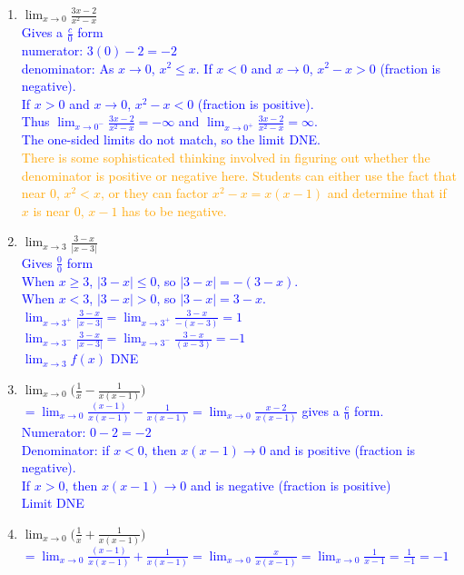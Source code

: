 \documentclass{ximera}
\begin{document}
\begin{exercise}
\begin{enumerate}
    \item $\displaystyle \lim_{x\rightarrow 0}\frac{3x-2}{x^2-x}$\\
     \textcolor{blue}{ Gives a $\frac{c}{0}$ form\\
   numerator: $3(0)-2=-2$\\
    denominator: As $x\rightarrow 0$, $x^2\leq x$.  If $x<0$ and $x\rightarrow 0$, $x^2-x>0$ (fraction is negative).\\
    If $x>0$ and $x\rightarrow 0$, $x^2-x<0$ (fraction is positive).\\
    Thus $\displaystyle \lim_{x\rightarrow 0^-} \frac{3x-2}{x^2-x}=-\infty$ and $\displaystyle \lim_{x\rightarrow 0^+} \frac{3x-2}{x^2-x}=\infty$.\\
    The one-sided limits do not match, so the limit DNE.}\\
    \textcolor{orange}{There is some sophisticated thinking involved in figuring out whether the denominator is positive or negative here.  Students can either use the fact that near 0, $x^2<x$, or they can factor $x^2-x=x(x-1)$ and determine that if $x$ is near 0, $x-1$ has to be negative.}

   \item $\displaystyle \lim_{x\rightarrow 3} \frac{3-x}{|x-3|}$\\
    \textcolor{blue}{ Gives $\frac{0}{0}$ form\\
    When $x\geq 3$, $|3-x|\leq 0$, so $|3-x|=-(3-x)$.\\
    When $x<3$, $|3-x|>0$, so $|3-x|=3-x$.\\
    $\lim_{x\rightarrow 3^+}\frac{3-x}{|x-3|}=\lim_{x\rightarrow 3^+}\frac{3-x}{-(x-3)}=1$\\
     $\lim_{x\rightarrow 3^-}\frac{3-x}{|x-3|}=\lim_{x\rightarrow 3^-}\frac{3-x}{(x-3)}=-1$\\
    $\lim_{x\rightarrow 3}f(x)$ DNE}

    \item $\displaystyle \lim_{x\rightarrow 0} \bigg( \frac{1}{x}-\frac{1}{x(x-1)}\bigg)$\\
    \textcolor{blue}{ $=\displaystyle\lim_{x\rightarrow 0} \frac{(x-1)}{x(x-1)}-\frac{1}{x(x-1)}=\lim_{x\rightarrow 0} \frac{x-2}{x(x-1)}$ gives a $\frac{c}{0}$ form.\\
    Numerator: $0-2=-2$\\
    Denominator: if $x<0$, then $x(x-1)\rightarrow 0$ and is positive (fraction is negative).\\
    If $x>0$, then $x(x-1)\rightarrow 0$ and is negative (fraction is positive)\\
    Limit DNE}

     \item $\displaystyle \lim_{x\rightarrow 0} \bigg( \frac{1}{x}+\frac{1}{x(x-1)}\bigg)$\\
     \textcolor{blue}{ $=\displaystyle\lim_{x\rightarrow 0} \frac{(x-1)}{x(x-1)}+\frac{1}{x(x-1)}=\lim_{x\rightarrow 0} \frac{x}{x(x-1)}=\lim_{x\rightarrow0} \frac{1}{x-1}=\frac{1}{-1}=-1$}


  \end{enumerate}
\end{exercise} 
\end{document}
